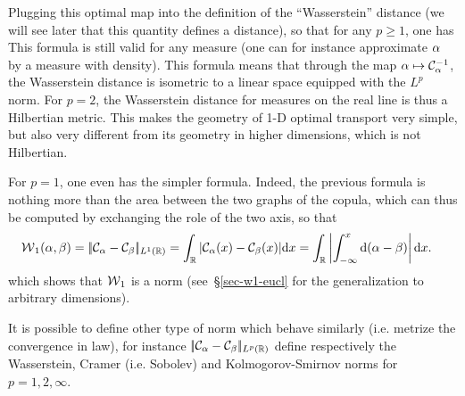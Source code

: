 Plugging this optimal map into the definition of the ``Wasserstein'' distance (we will see later that this quantity defines a distance), so that for any $p \geq 1$, one has
This formula is still valid for any measure (one can for instance approximate $\alpha$ by a measure with density). 
%
This formula means that through the map $\alpha \mapsto \mathcal{C}_{\alpha}^{-1}$, the Wasserstein distance is isometric to a linear space equipped with the $L^p$ norm. For $p=2$, the Wasserstein distance for measures on the real line is thus a Hilbertian metric. 
This makes the geometry of 1-D optimal transport very simple, but also very different from its geometry in higher dimensions, which is not Hilbertian.

For $p=1$, one even has the simpler formula. Indeed, the previous formula is nothing more than the area between the two graphs of the copula, which can thus be computed by exchanging the role of the two axis, so that 
\begin{align}\label{eq-w1-1d}
	\operatorname{\mathcal{W}}_1(\alpha,\beta) &= |\!|  \mathcal{C}_{\alpha} - \mathcal{C}_{\beta}  |\!|_{L^1(\mathbb{R})} = 
	\int_{\mathbb{R}} | \mathcal{C}_{\alpha}(x) - \mathcal{C}_{\beta}(x) | \mathrm{d} x 
	= \int_{\mathbb{R}} \left\lvert \int_{-\infty}^x \mathrm{d}(\alpha-\beta) \right\rvert \mathrm{d} x.
\end{align}
which shows that $\operatorname{\mathcal{W}}_1$ is a norm (see~\S\ref{sec-w1-eucl} for the generalization to arbitrary dimensions). 

It is possible to define other type of norm which behave similarly (i.e. metrize the convergence in law), for instance $|\!|  \mathcal{C}_{\alpha} - \mathcal{C}_{\beta}  |\!|_{L^p(\mathbb{R})}$ define respectively the Wasserstein, Cramer (i.e. Sobolev) and Kolmogorov-Smirnov norms for $p=1,2,\infty$. 





